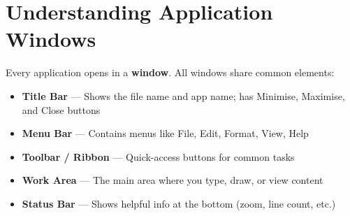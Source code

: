 \section{Understanding Application Windows}
\label{sec:app-windows}

Every application opens in a \textbf{window}. All windows share common elements:

\begin{theorybox}
\begin{itemize}[leftmargin=*, label={\textcolor{ModuleBlue}{\faAngleRight}}, itemsep=3pt]
  \item \textbf{Title Bar} --- Shows the file name and app name; has Minimise, Maximise, and Close buttons
  \item \textbf{Menu Bar} --- Contains menus like File, Edit, Format, View, Help
  \item \textbf{Toolbar / Ribbon} --- Quick-access buttons for common tasks
  \item \textbf{Work Area} --- The main area where you type, draw, or view content
  \item \textbf{Status Bar} --- Shows helpful info at the bottom (zoom, line count, etc.)
\end{itemize}
\end{theorybox}

